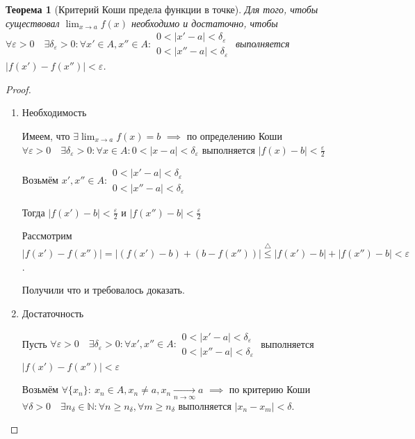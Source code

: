 \documentclass[a4paper,oneside]{article}
\newcommand{\dslim}{\displaystyle\lim}
\newcommand{\N}{\mathbb{N}}
\newcommand{\eps}{\varepsilon}
\newcommand{\approach}[1]{\underset{#1}{\longrightarrow}}
\newtheorem{theorem}{Теорема}[subsection]
\theoremstyle{definition}
\theoremstyle{definition}
\theoremstyle{definition}
\begin{document}
\begin{theorem}[Критерий Коши предела функции в точке]
    Для того, чтобы существовал $\dslim_{x \to a} f(x)$ необходимо и достаточно, чтобы
    $\forall \eps > 0 \quad \exists \delta_\eps > 0: \forall x' \in A, x'' \in A:
    \begin{array}{c}
        0 < | x' - a | < \delta_\eps \\
        0 < | x'' - a | < \delta_\eps
    \end{array}$ выполняется $| f(x') - f(x'') | < \eps$.
\end{theorem}
\begin{proof}
    \begin{enumerate}[label=\alph*)]
        \item 
            Необходимость

            Имеем, что $\exists \dslim_{x \to a} f(x) = b$ $\implies$ по определению Коши
            $\forall \eps > 0 \quad \exists \delta_\eps > 0: \forall x \in A: 0 < | x - a | < \delta_\eps$
            выполняется $| f(x) - b | < \frac{\eps}{2}$

            Возьмём $x', x'' \in A:
            \begin{array}{c}
                0 < | x' - a | < \delta_\eps \\
                0 < | x'' - a | < \delta_\eps
            \end{array}$

            Тогда $| f(x') - b | < \frac{\eps}{2}$ и $| f(x'') - b | < \frac{\eps}{2}$

            Рассмотрим $| f(x') - f(x'') | = | (f(x') - b) + (b - f(x'')) | \stackrel{\triangle}{\le}
            | f(x') - b | + | f(x'') - b | < \eps$.

            Получили что и требовалось доказать.
        
        \item
            Достаточность

            Пусть $\forall \eps > 0 \quad \exists \delta_\eps > 0: \forall x', x'' \in A:
            \begin{array}{c}
                0 < | x' - a | < \delta_\eps \\
                0 < | x'' - a | < \delta_\eps
            \end{array}$ выполняется $| f(x') - f(x'') | < \eps$

            Возьмём $\forall \{ x_n \}: \: x_n \in A, x_n \ne a, x_n \approach{n \to \infty} a$
            $\implies$ по критерию Коши $\forall \delta > 0 \quad \exists n_\delta \in \N:
            \forall n \ge n_\delta, \forall m \ge n_\delta$ выполняется $| x_n - x_m | < \delta$.


\end{enumerate}
\end{proof}
\end{document}
